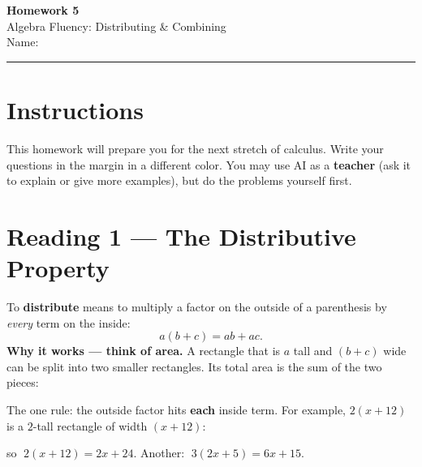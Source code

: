\documentclass[12pt]{article}
\begin{document}
\pagestyle{fancy}
\begin{center}
  {\Large\bfseries Homework 5}\\[4pt]
  Algebra Fluency: Distributing \& Combining\\[6pt]
  Name:\;\underline{\hspace{6.5cm}}\quad
\end{center}
\hrule\bigskip

\section*{Instructions}
This homework will prepare you for the next stretch of calculus. Write
your questions in the margin in a different color. You may use AI as a
\textbf{teacher} (ask it to explain or give more examples), but do the problems yourself first.

\section*{Reading 1 --- The Distributive Property}
To \textbf{distribute} means to multiply a factor on the outside of a parenthesis by \emph{every} term on the
inside:
\[
  a(b + c) = ab + ac.
\]
\textbf{Why it works --- think of area.} A rectangle that is $a$ tall and $(b+c)$ wide can be split into two
smaller rectangles. Its total area is the sum of the two pieces:

\begin{center}
\end{center}

The one rule: the outside factor hits \textbf{each} inside term. For example, $2(x+12)$ is a $2$-tall rectangle of
width $(x+12)$:

\begin{center}
\end{center}
so $\;2(x+12) = 2x + 24$. Another: $\;3(2x+5) = 6x + 15$.
\end{document}

